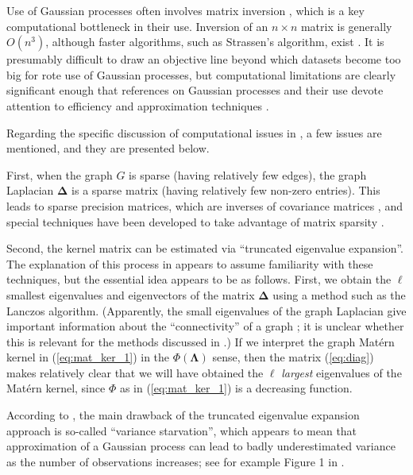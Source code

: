 Use of Gaussian processes often involves matrix inversion \cite{banerjee2013efficient, liu2020gaussian}, which is a key computational bottleneck in their use. Inversion of an $n \times n$ matrix is generally $O(n^3)$, although faster algorithms, such as Strassen's algorithm, exist \cite{clrs}. It is presumably difficult to draw an objective line beyond which datasets become too big for rote use of Gaussian processes, but computational limitations are clearly significant enough that references on Gaussian processes and their use devote attention to efficiency and approximation techniques \cite{rw,garnett_bayesoptbook_2023}.

Regarding the specific discussion of computational issues in \cite{pmlr-v130-borovitskiy21a}, a few issues are mentioned, and they are presented below.

First, when the graph $G$ is sparse (having relatively few edges), the graph Laplacian $\bm \Delta$ is a sparse matrix (having relatively few non-zero entries). This leads to sparse precision matrices, which are inverses of covariance matrices \cite{garnett_bayesoptbook_2023}, and special techniques have been developed to take advantage of matrix sparsity \cite{golubvanloan}. 

Second, the kernel matrix can be estimated via ``truncated eigenvalue expansion''. The explanation of this process in \cite{pmlr-v130-borovitskiy21a} appears to assume familiarity with these techniques, but the essential idea appears to be as follows. First, we obtain the $\ell$ smallest eigenvalues and eigenvectors of the matrix $\bm \Delta$ using a method such as the Lanczos algorithm. (Apparently, the small eigenvalues of the graph Laplacian give important information about the ``connectivity'' of a graph \cite{cook}; it is unclear whether this is relevant for the methods discussed in \cite{pmlr-v130-borovitskiy21a}.) If we interpret the graph Mat\'{e}rn kernel in (\ref{eq:mat_ker_1}) in the $\Phi(\bm \Lambda)$ sense, then the matrix (\ref{eq:diag}) makes relatively clear that we will have obtained the $\ell$ \textit{largest} eigenvalues of the Mat\'{e}rn kernel, since $\Phi$ as in (\ref{eq:mat_ker_1}) is a decreasing function. %

According to \cite{pmlr-v130-borovitskiy21a}, the main drawback of the truncated eigenvalue expansion approach is so-called ``variance starvation'', which appears to mean that approximation of a Gaussian process can lead to badly underestimated variance as the number of observations increases; see for example Figure 1 in \cite{wang2018batched}.

